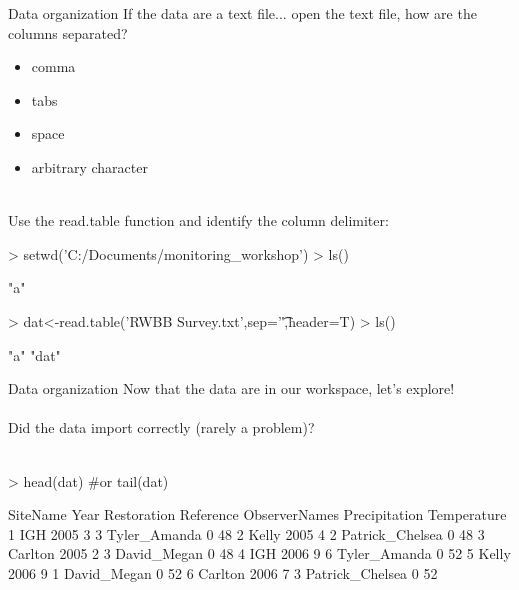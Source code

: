 \documentclass[xcolor=svgnames]{beamer}
\begin{document}
\begin{frame}{Data organization}
If the data are a text file... open the text file, how are the columns separated?
\begin{itemize}
\item comma
\item tabs
\item space
\item arbitrary character\\~\\
\end{itemize}

Use the read.table function and identify the column delimiter:
\begin{Schunk}
\begin{Sinput}
> setwd('C:/Documents/monitoring_workshop')
> ls() 
\end{Sinput}
\begin{Soutput}
[1] "a"
\end{Soutput}
\begin{Sinput}
> dat<-read.table('RWBB Survey.txt',sep='\t',header=T)
> ls() 
\end{Sinput}
\begin{Soutput}
[1] "a"   "dat"
\end{Soutput}
\end{Schunk}
\end{frame}

\begin{frame}[fragile]{Data organization}
Now that the data are in our workspace, let's explore!\\~\\
Did the data import correctly (rarely a problem)?\\~\\
\begin{Schunk}
\begin{Sinput}
> head(dat) #or tail(dat)
\end{Sinput}
\end{Schunk}
\scriptsize
\begin{Schunk}
\begin{Soutput}
  SiteName Year Restoration Reference   ObserverNames Precipitation Temperature
1      IGH 2005           3         3    Tyler_Amanda             0          48
2    Kelly 2005           4         2 Patrick_Chelsea             0          48
3  Carlton 2005           2         3     David_Megan             0          48
4      IGH 2006           9         6    Tyler_Amanda             0          52
5    Kelly 2006           9         1     David_Megan             0          52
6  Carlton 2006           7         3 Patrick_Chelsea             0          52
\end{Soutput}
\end{Schunk}
\end{frame}
\end{document}
